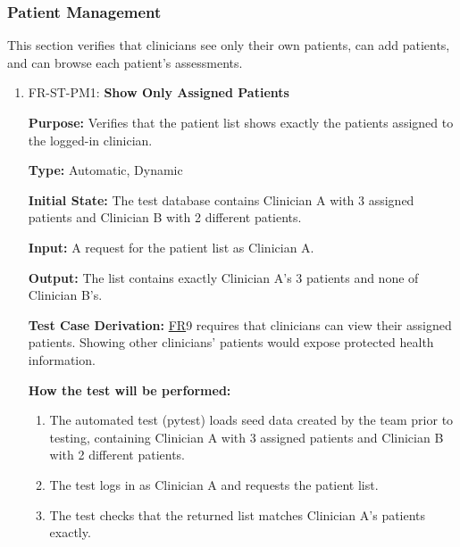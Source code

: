 \documentclass[12pt, titlepage]{article}
\newcommand{\srsfr}[1]{\href{https://github.com/Nour-Fawaz/MacaBoca/blob/main/pdfs/SRS/SRS.pdf}{FR}}
\renewcommand{\_}{\oldunderscore\allowbreak}
\begin{document}
\subsubsection{Patient Management}
This section verifies that clinicians see only their own patients, can add patients, and can browse each patient's assessments.
\begin{enumerate}
  \item FR-ST-PM1: \textbf{Show Only Assigned Patients\\}
  \begin{mdframed}[linewidth=0.5mm]
      \textbf{Purpose:} Verifies that the patient list shows exactly the patients assigned to the logged-in clinician. \par
      \textbf{Type:} Automatic, Dynamic \par
      \textbf{Initial State:} The test database contains Clinician A with 3 assigned patients and Clinician B with 2 different patients. \par
      \textbf{Input:} A request for the patient list as Clinician A. \par
      \textbf{Output:} The list contains exactly Clinician A's 3 patients and none of Clinician B's. \par
      \textbf{Test Case Derivation:} \srsfr*{9} requires that clinicians can view their assigned patients. Showing other clinicians' patients would expose protected health information. \par
      \textbf{How the test will be performed:}
      \begin{enumerate}
          \item[1.] The automated test (pytest) loads seed data created by the team prior to testing, containing Clinician A with 3 assigned patients and Clinician B with 2 different patients.
          \item[2.] The test logs in as Clinician A and requests the patient list.
          \item[3.] The test checks that the returned list matches Clinician A's patients exactly.
      \end{enumerate}
  \end{mdframed}


\end{enumerate}
\end{document}
